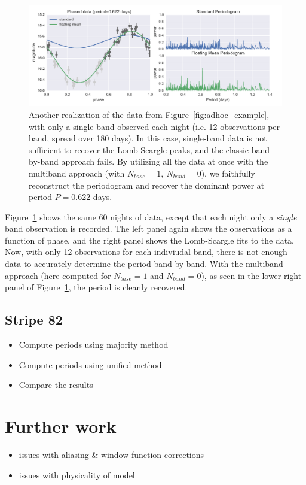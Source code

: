 \documentclass[12pt,preprint]{aastex}
\newcommand{\Fig}[1]{Figure~\ref{fig:#1}}
\newcommand{\fig}[1]{\Fig{#1}}
\newcommand{\figlabel}[1]{\label{fig:#1}}
\begin{document}
\begin{figure}
  \centering
  \includegraphics[width=\textwidth]{fig02.pdf}
  \caption{
    Another realization of the data from \fig{adhoc_example}, with only a single
    band observed each night (i.e. 12 observations per band, spread over 180
    days). In this case, single-band data is not sufficient to recover the
    Lomb-Scargle peaks, and the classic band-by-band approach fails.
    By utilizing all the data at once with the multiband approach
    (with $N_{base}=1,~N_{band}=0$),
    we faithfully reconstruct the periodogram and recover
    the dominant power at period $P=0.622$ days.
  } 
  \figlabel{multi_example}
\end{figure}

\fig{multi_example} shows the same 60 nights of data, except that each night only a {\it single} band observation is recorded. The left panel again shows the observations as a function of phase, and the right panel shows the Lomb-Scargle fits to the data. Now, with only 12 observations for each indiviudal band, there is not enough data to accurately determine the period band-by-band. With the multiband approach (here computed for $N_{base}=1$ and $N_{band}=0$), as seen in the lower-right panel of \fig{multi_example}, the period is cleanly recovered.


\subsection{Stripe 82}

\begin{itemize}
  \item Compute periods using majority method
  \item Compute periods using unified method
  \item Compare the results
\end{itemize}

\section{Further work}

\begin{itemize}
  \item issues with aliasing \& window function corrections
  \item issues with physicality of model
\end{itemize}





\end{document}
